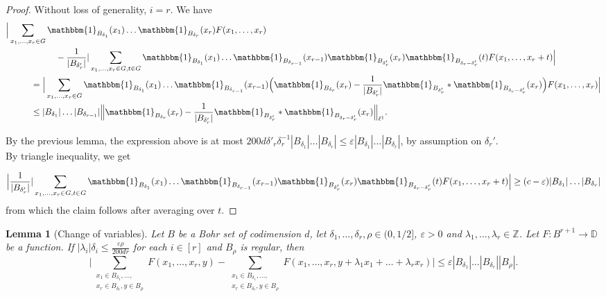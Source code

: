 \documentclass[a4paper,11pt]{article}
\numberwithin{theorem}{section}
\newtheorem{lemma}[theorem]{Lemma}
\theoremstyle{definition}
\newcommand\id{\mathbbm{1}}
\newcommand\ssk[1]{
	\substack{#1}
}
\begin{document}
\begin{proof}
    Without loss of generality, $i = r$. We have
    \begin{align*}&\Big|\sum_{x_1, \dots, x_r \in G} \id_{B_{\delta_1}}(x_1) \dots \id_{B_{\delta_r}}(x_r) F(x_1, \dots, x_r) \\
    &\hspace{2cm}- \frac{1}{|B_{\delta'_r}|} |\sum_{x_1, \dots, x_r \in G, t\in G} \id_{B_{\delta_1}}(x_1) \dots \id_{B_{\delta_{r-1}}}(x_{r-1}) \id_{B_{\delta'_r}}(x_r)\id_{B_{\delta_r - \delta'_r}}(t) F(x_1, \dots, x_r + t)\Big|\\
    &\hspace{1cm}= \Big|\sum_{x_1, \dots, x_r \in G} \id_{B_{\delta_1}}(x_1) \dots \id_{B_{\delta_{r-1}}}(x_{r-1}) \Big(\id_{B_{\delta_r}}(x_r) - \frac{1}{|B_{\delta'_r}|}\id_{B_{\delta'_r}} \ast \id_{B_{\delta_r - \delta'_r}}(x_r)\Big)F(x_1, \dots, x_r)\Big|\\
    &\hspace{1cm}\leq |B_{\delta_1}|\dots |B_{\delta_{r-1}}| \Big\|\id_{B_{\delta_r}}(x_r) - \frac{1}{|B_{\delta'_r}|} \id_{B_{\delta'_r}} \ast \id_{B_{\delta_r - \delta'_r}}(x_r)\Big\|_{\ell^1}.
    \end{align*}

    By the previous lemma, the expression above is at most $200d \delta'_r \delta_r^{-1} |B_{\delta_1}|\dots |B_{\delta_r}| \leq \varepsilon |B_{\delta_1}|\dots |B_{\delta_r}|$, by assumption on $\delta_r'$. \\

    By triangle inequality, we get

    \[\Big|\frac{1}{|B_{\delta'_r}|} |\sum_{x_1, \dots, x_r \in G, t \in G} \id_{B_{\delta_1}}(x_1) \dots \id_{B_{\delta_{r-1}}}(x_{r-1}) \id_{B_{\delta'_r}}(x_r)\id_{B_{\delta_r - \delta'_r}}(t) F(x_1, \dots, x_r + t)\Big| \geq (c - \varepsilon)|B_{\delta_1}|\dots |B_{\delta_r}|\]
    from which the claim follows after averaging over $t$.
\end{proof}

\begin{lemma}[Change of variables]\label{regularbohrchangeVar}
    Let $B$ be a Bohr set of codimension $d$, let $\delta_1,\dots, \delta_r, \rho \in (0,1/2]$, $\varepsilon > 0$ and $\lambda_1, \dots, \lambda_r \in \mathbb{Z}$. Let $F : B^{r+1} \to \mathbb{D}$ be a function. If $|\lambda_i|\delta_i \leq \frac{\varepsilon \rho}{200dr}$ for each $i \in [r]$ and $B_\rho$ is regular, then
    \[\Big|\sum_{\ssk{x_1 \in B_{\delta_1}, \dots, \\x_r \in B_{\delta_r}, y \in B_\rho}}  F(x_1, \dots, x_r, y)  - \sum_{\ssk{x_1 \in B_{\delta_1}, \dots,\\ x_r \in B_{\delta_r}, y \in B_\rho}} F(x_1, \dots, x_r, y + \lambda_1 x_1 + \dots + \lambda_r x_r)  \Big| \leq \varepsilon |B_{\delta_1}| \dots |B_{\delta_r}| |B_\rho|.\]
\end{lemma}
\end{document}
